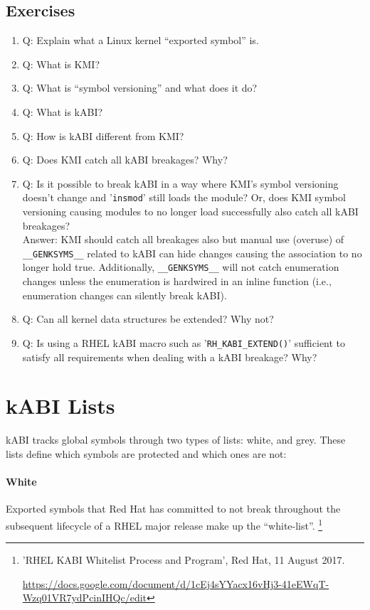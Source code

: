 \documentclass[10pt,oneside,english]{book}
\begin{document}
\section{Exercises}
\begin{enumerate}
\item Q: Explain what a Linux kernel ``exported symbol'' is. 
\item Q: What is KMI? 
\item Q: What is ``symbol versioning'' and what does it do? 
\item Q: What is kABI? 
\item Q: How is kABI different from KMI? 
\item Q: Does KMI catch all kABI breakages? Why? 
\item Q: Is it possible to break kABI in a way where KMI's symbol versioning
doesn't change and '\texttt{insmod}' still loads the module? Or, does
KMI symbol versioning causing modules to no longer load successfully
also catch all kABI breakages?\\
Answer: KMI should catch all breakages also but manual use (overuse)
of \texttt{\_\_GENKSYMS\_\_} related to kABI can hide changes causing
the association to no longer hold true. Additionally, \texttt{\_\_GENKSYMS\_\_}
will not catch enumeration changes unless the enumeration is hardwired
in an inline function (i.e., enumeration changes can silently break
kABI). 
\item Q: Can all kernel data structures be extended? Why not? 
\item Q: Is using a RHEL kABI macro such as '\texttt{RH\_KABI\_EXTEND()}'
sufficient to satisfy all requirements when dealing with a kABI breakage?
Why?\pagebreak{}
\end{enumerate}

\appendix

\chapter{kABI Lists\label{chap:kABI-Lists}}

kABI tracks global symbols through two types of lists: white, and
grey. These lists define which symbols are protected and which ones
are not:

\subsubsection{White}

Exported symbols that Red Hat has committed to not break throughout
the subsequent lifecycle of a RHEL major release make up the ``white-list''.
\footnote{'RHEL KABI Whitelist Process and Program', Red Hat, 11 August 2017.

\url{https://docs.google.com/document/d/1cEj4sYYacx16vHj3-41eEWqT-Wzq01VR7ydPcinIHQc/edit}}
\end{document}
